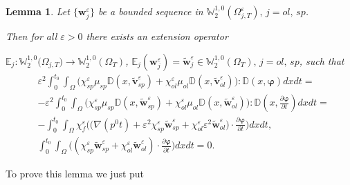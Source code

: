 \documentclass{article}
\theoremstyle{plain}
\newtheorem{lemma}[theorem]{Lemma}
\theoremstyle{definition}
\numberwithin{equation}{section}
\begin{document}
\begin{lemma}\label{l2.13}
Let $\{\boldsymbol{w}^{\varepsilon}_{j}\}$ be a bounded sequence in
$\mathbb{W}^{1,0}_{2}(\Omega^{\varepsilon}_{j,T}),\,j=ol,\,sp$.

Then for all $\varepsilon>0$ there exists an extension operator

$\mathbb{E}_{j}:\mathbb{W}^{1,0}_{2}\big(\Omega_{j,T}\big)\rightarrow\mathbb{W}^{1,0}_{2}(\Omega_{T})$,
$\mathbb{E}_{j}({\boldsymbol{w}}_{j}^{\varepsilon})=
\widetilde{\boldsymbol{w}}^{\varepsilon}_{j}\in\mathbb{W}^{1,0}_{2}(\Omega_{T}),\,j=ol,\,sp$, such that
\begin{equation}\label{eq2.16}
\begin{aligned}
&
\varepsilon^{2}\int_{0}^{t_{0}}\int_{\Omega}\big(\chi^{\varepsilon}_{sp}\mu_{sp}
\mathbb{D}(x,\widetilde{\boldsymbol{v}}^{\varepsilon}_{sp})+\chi^{\varepsilon}_{ol}\mu_{ol}
\mathbb{D}(x,\widetilde{\boldsymbol{v}}^{\varepsilon}_{ol})\big):
\mathbb{D}(x,\boldsymbol{\varphi})dxdt=
\\
& -\varepsilon^{2}\int_{0}^{t_{0}}\int_{\Omega}\big(\chi^{\varepsilon}_{sp}\mu_{sp}
\mathbb{D}(x,\widetilde{\boldsymbol{w}}^{\varepsilon}_{sp})+\chi^{\varepsilon}_{ol}\mu_{ol}
\mathbb{D}(x,\widetilde{\boldsymbol{w}}^{\varepsilon}_{ol})\big):
\mathbb{D}(x,\frac{\partial\boldsymbol{\varphi}}{\partial{t}})dxdt=
\\
& -\int_{0}^{t_{0}}\int_{\Omega}\chi^{\varepsilon}_{f}\Big(\big(\nabla({p}^{0}t)+\varepsilon^{2}
\chi^{\varepsilon}_{sp}\widetilde{\boldsymbol{w}}^{\varepsilon}_{sp}+\chi^{\varepsilon}_{ol}
\varepsilon^{2}\widetilde{\boldsymbol{w}}^{\varepsilon}_{ol}\big)
\cdot\frac{\partial\boldsymbol{\varphi}}{\partial{t}}\Big)dxdt,
\\
& \int_{0}^{t_{0}}\int_{\Omega}\big((\chi^{\varepsilon}_{sp}\widetilde{\boldsymbol{w}}^{\varepsilon}_{sp}+
\chi^{\varepsilon}_{ol}\widetilde{\boldsymbol{w}}^{\varepsilon}_{ol})\cdot
\frac{\partial\boldsymbol{\varphi}}{\partial{t}}\big)dxdt=0.
\end{aligned}
\end{equation}
\end{lemma}
To prove this lemma we just put
\end{document}
